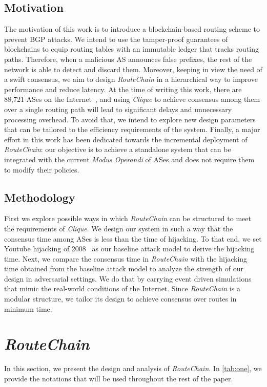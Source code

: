 \documentclass[5p]{elsarticle}
\newcommand{\rc}{{{\em RouteChain}}\xspace}
\begin{document}
\subsection{Motivation}\label{sec:motivation}
The motivation of this work is to introduce a blockchain-based routing scheme to prevent BGP attacks. We intend to use the tamper-proof guarantees of blockchains to equip routing tables with an immutable ledger that tracks routing paths. Therefore, when a malicious AS announces false prefixes, the rest of the network is able to detect and discard them. Moreover, keeping in view the need of a swift consensus, we aim to design \rc in a hierarchical way to improve performance and reduce latency. At the time of writing this work, there are 88,721 ASes on the Internet~\cite{RIR-18}, and using {\em Clique} to achieve consensus among them over a single routing path will lead to significant delays and unnecessary processing overhead. To avoid that, we intend to explore new design parameters that can be tailored to the efficiency requirements of the system.  Finally, a major effort in this work has been dedicated towards the incremental deployment of \rc: our objective is to achieve a standalone system that can be integrated with the current {\em Modus Operandi} of ASes and does not require them to modify their policies. 


\subsection{Methodology}\label{sec:method}
First we explore possible ways in which \rc can be structured to meet the requirements of {\em Clique}. We design our system in such a way that the consensus time among ASes is less than the time of hijacking. To that end, we set Youtube hijacking of 2008~\cite{GoldbergS14} as our baseline attack model to derive the hijacking time. Next, we compare the consensus time in \rc with the hijacking time obtained from the baseline attack model to analyze the strength of our design in adversarial settings. We do that by carrying event driven simulations that mimic the real-world conditions of the Internet. Since \rc is a modular structure, we tailor its design to achieve consensus over routes in minimum time. 




\section{\rc}\label{sec:rc}
In this section, we present the design and analysis of \rc. In \autoref{tab:one}, we provide the notations that will be used throughout the rest of the paper.  
\end{document}
